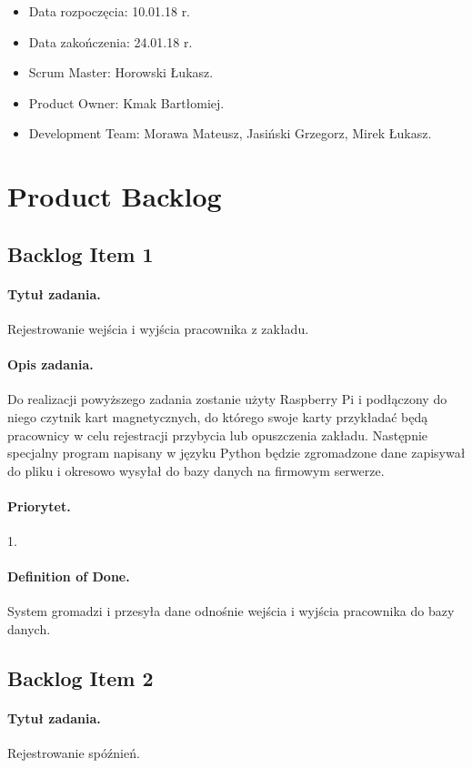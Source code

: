 \documentclass[a4paper]{article}
\begin{document}
\begin{itemize}
\item Data rozpoczęcia: 10.01.18 r.
\item Data zakończenia: 24.01.18 r.
\item Scrum Master: Horowski Łukasz.
\item Product Owner: Kmak Bartłomiej.
\item Development Team: Morawa Mateusz, Jasiński Grzegorz, Mirek Łukasz.
\end{itemize}

\section{Product Backlog}

\subsection{Backlog Item 1}
\paragraph{Tytuł zadania.} Rejestrowanie wejścia i wyjścia pracownika z zakładu.
\paragraph{Opis zadania.} Do realizacji powyższego zadania zostanie użyty Raspberry Pi i podłączony do niego czytnik kart magnetycznych, do którego swoje karty przykładać będą pracownicy w celu rejestracji przybycia lub opuszczenia zakładu. Następnie specjalny program napisany w języku Python będzie zgromadzone dane zapisywał do pliku i okresowo wysyłał do bazy danych na firmowym serwerze.
\paragraph{Priorytet.} 1.
\paragraph{Definition of Done.} System gromadzi i przesyła dane odnośnie wejścia i wyjścia pracownika do bazy danych.


\subsection{Backlog Item 2}
\paragraph{Tytuł zadania.} Rejestrowanie spóźnień.
\end{document}
